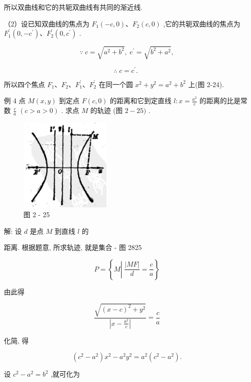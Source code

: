 \documentclass[lang=cn,newtx,10pt,scheme=chinese]{elegantbook}
\begin{document}
所以双曲线和它的共轭双曲线有共同的渐近线.

（2）设已知双曲线的焦点为 \({F}_{1}\left( {-c,0}\right) \text{、}{F}_{2}\left( {c,0}\right)\) ,它的共轭双曲线的焦点为 \({F}_{1}^{\prime }\left( {0, - {c}^{\prime }}\right) \text{、}{F}_{2}^{\prime }\left( {0,{c}^{\prime }}\right)\) .

\[
  \because \;c = \sqrt{{a}^{2} + {b}^{2}},\;{c}^{\prime } = \sqrt{{b}^{2} + {a}^{2}},
\]

\[
  \therefore \;c = {c}^{\prime }\text{. }
\]

所以四个焦点 \({F}_{1}\text{、}{F}_{2}\text{、}{F}_{1}^{\prime }\text{、}{F}_{2}^{\prime }\) 在同一个圆 \({x}^{2} + {y}^{2} = {a}^{2} + {b}^{2}\) 上(图 2-24).

例 4 点 \(M\left( {x,y}\right)\) 到定点 \(F\left( {c,0}\right)\) 的距离和它到定直线 \(l : x = \frac{{a}^{2}}{c}\) 的距离的比是常数 \(\frac{c}{a}\) \(\left( {c > a > 0}\right)\) . 求点 \(M\) 的轨迹 (图 \(2 - {25})\) .

\begin{figure}[h]
  \centering
  \includegraphics[max width=0.4\textwidth]{images/01912cc2-ffb6-728e-9ae7-b113ff05c64b_104_910731.jpg}
  \caption{图 2 - 25}
\end{figure}

解: 设 \(d\) 是点 \(M\) 到直线 \(l\) 的

距离. 根据题意, 所求轨迹, 就是集合 - 图 2825

\[
  P = \left\{ {M\left| {\;\frac{\left| MF\right| }{d} = \frac{c}{a}}\right. }\right\}
\]

由此得

\[
  \frac{\sqrt{{\left( x - c\right) }^{2} + {y}^{2}}}{\left| x - \frac{{a}^{2}}{c}\right| } = \frac{c}{a}
\]

化简, 得

\[
  \left( {{c}^{2} - {a}^{2}}\right) {x}^{2} - {a}^{2}{y}^{2} = {a}^{2}\left( {{c}^{2} - {a}^{2}}\right) .
\]

设 \({c}^{2} - {a}^{2} = {b}^{2}\) ,就可化为
\end{document}
